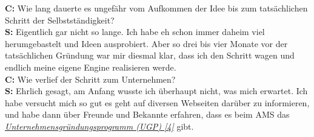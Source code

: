 \documentclass[10pt,a4paper,ngerman,twoside]{article} %
\begin{document}
\begin{multicols}{3}
\textbf{C:} Wie lang dauerte es ungefähr vom Aufkommen der Idee bis zum tatsächlichen Schritt der Selbstständigkeit? \\
\textbf{S:} Eigentlich gar nicht so lange. Ich habe eh schon immer daheim viel herumgebastelt und Ideen ausprobiert. Aber so drei bis vier Monate vor der tatsächlichen Gründung war mir diesmal klar, dass ich den Schritt wagen und endlich meine eigene Engine realisieren werde.\\
\textbf{C:} Wie verlief der Schritt zum Unternehmen? \\
\textbf{S:} Ehrlich gesagt, am Anfang wusste ich überhaupt nicht, was mich erwartet. Ich habe versucht mich so gut es geht auf diversen Webseiten darüber zu informieren, und habe dann über Freunde und Bekannte erfahren, dass es beim AMS das \href{http://www.ams.at/sfa/14081_10435.html}{\textit{Unternehmensgründungsprogramm (UGP) [4]}} gibt.


\end{multicols}
\end{document}
